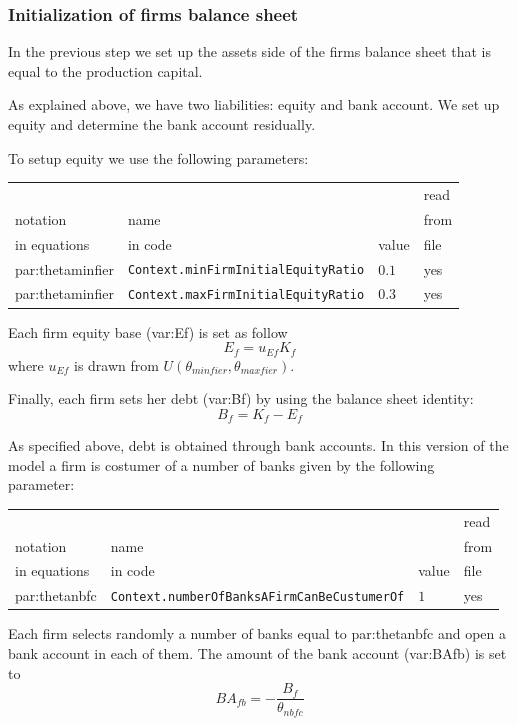 \documentclass{book}
\begin{document}
\subsubsection{Initialization of firms balance sheet}

In the previous step we set up the assets side of the firms balance sheet that is equal to the production capital.

As explained above, we have two liabilities: equity and bank account. We set up equity and determine the bank account residually.

To setup equity we use the following parameters:

\noindent
\begin{tabular}{l l l l}
	\hline
	& &&read\\
	notation& name &&from\\
	in equations& in code&value&file\\
	\hline
	\hline
 \gls{par:thetaminfier}&\verb+Context.minFirmInitialEquityRatio+&$0.1$&yes\\
 \gls{par:thetaminfier}&\verb+Context.maxFirmInitialEquityRatio+&$0.3$&yes\\
	\hline
\end{tabular}

\vskip5mm
Each firm equity base (\gls{var:Ef}) is set as follow
\[
	E_f=u_{Ef}K_f
\]
where $u_{Ef}$ is drawn from $U(\theta_{minfier},\theta_{maxfier})$.

Finally, each firm sets her debt (\gls{var:Bf}) by using the balance sheet identity:
\[
B_f=K_f-E_f
\]

As specified above, debt is obtained through bank accounts.
In this version of the model a firm is costumer of a number of banks given by the following\\
parameter:

\vskip2mm
\noindent
\begin{tabular}{l l l l}
	\hline
	& &&read\\
	notation& name &&from\\
	in equations& in code&value&file\\
	\hline
	\hline
 \gls{par:thetanbfc}&\verb+Context.numberOfBanksAFirmCanBeCustumerOf+&$1$&yes\\
	\hline
\end{tabular}

\vskip2mm
Each firm selects randomly a number of banks equal to \gls{par:thetanbfc} and open a bank account in each of them. The amount of the bank account (\gls{var:BAfb}) is set to
\[
	BA_{fb}=-\frac{B_f}{\theta_{nbfc}}
\]
\end{document}
